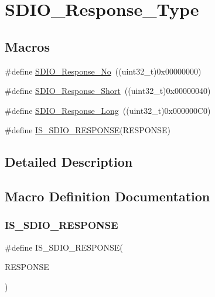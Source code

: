 \hypertarget{group___s_d_i_o___response___type}{}\section{S\+D\+I\+O\+\_\+\+Response\+\_\+\+Type}
\label{group___s_d_i_o___response___type}
\subsection*{Macros}
\begin{DoxyCompactItemize}
\item 
\#define \mbox{\hyperlink{group___s_d_i_o___response___type_ga308b8ef0e79ba451644dda923bb3ac41}{S\+D\+I\+O\+\_\+\+Response\+\_\+\+No}}~((uint32\+\_\+t)0x00000000)
\item 
\#define \mbox{\hyperlink{group___s_d_i_o___response___type_ga1f61768f90641648fd5c12e8d2f7e508}{S\+D\+I\+O\+\_\+\+Response\+\_\+\+Short}}~((uint32\+\_\+t)0x00000040)
\item 
\#define \mbox{\hyperlink{group___s_d_i_o___response___type_ga1a11a8750612b344214f846784046bb0}{S\+D\+I\+O\+\_\+\+Response\+\_\+\+Long}}~((uint32\+\_\+t)0x000000\+C0)
\item 
\#define \mbox{\hyperlink{group___s_d_i_o___response___type_gae4df2359c9b637694b9baa220c16e062}{I\+S\+\_\+\+S\+D\+I\+O\+\_\+\+R\+E\+S\+P\+O\+N\+SE}}(R\+E\+S\+P\+O\+N\+SE)
\end{DoxyCompactItemize}


\subsection{Detailed Description}


\subsection{Macro Definition Documentation}
\mbox{\label{group___s_d_i_o___response___type_gae4df2359c9b637694b9baa220c16e062}} 
\subsubsection{\texorpdfstring{IS\_SDIO\_RESPONSE}{IS\_SDIO\_RESPONSE}}
{\footnotesize\ttfamily \#define I\+S\+\_\+\+S\+D\+I\+O\+\_\+\+R\+E\+S\+P\+O\+N\+SE(\begin{DoxyParamCaption}\item[{}]{R\+E\+S\+P\+O\+N\+SE }\end{DoxyParamCaption})}

